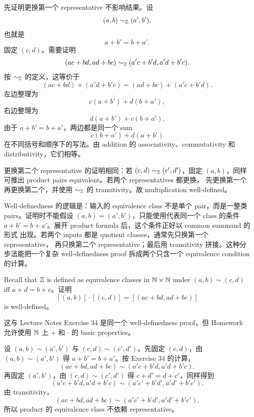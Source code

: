 \begin{solution}
先证明更换第一个 representative 不影响结果。设
\[
  (a,b)\sim_{\mathbb{Z}}(a',b'),
\]
也就是
\[
  a+b'=b+a'.
\]
固定 \((c,d)\)。需要证明
\[
  (ac+bd,ad+bc)\sim_{\mathbb{Z}}(a'c+b'd,a'd+b'c).
\]
按 \(\sim_{\mathbb{Z}}\) 的定义，这等价于
\[
  (ac+bd)+(a'd+b'c)=(ad+bc)+(a'c+b'd).
\]
左边整理为
\[
  c(a+b')+d(b+a'),
\]
右边整理为
\[
  d(a+b')+c(b+a').
\]
由于 \(a+b'=b+a'\)，两边都是同一个 sum
\[
  c(b+a')+d(a+b')
\]
在不同括号和顺序下的写法。由 addition 的 associativity、commutativity 和
distributivity，它们相等。

更换第二个 representative 的证明相同：若 \((c,d)\sim_{\mathbb{Z}}(c',d')\)，固定
\((a,b)\)，同样可推出 product pairs equivalent。若两个 representatives 都更换，
先更换第一个再更换第二个，并使用 \(\sim_{\mathbb{Z}}\) 的 transitivity。故 multiplication
well-defined。
\end{solution}

\begin{explanation}
Well-definedness 的逻辑是：输入的 equivalence class 不是单个 pair，而是一整类
pairs。证明时不能假设 \((a,b)=(a',b')\)，只能使用代表同一个 class 的条件
\(a+b'=b+a'\)。展开 product formula 后，这个条件正好以 common summand 的形式
出现。若两个 inputs 都是 quotient classes，通常先只换第一个 representative，
再只换第二个 representative；最后用 transitivity 拼接。这种分步法能把一个复杂
well-definedness proof 拆成两个只含一个 equivalence condition 的计算。
\end{explanation}

\begin{exerciseblock}
Recall that \(\mathbb{Z}\) is defined as equivalence classes in \(\mathbb{N}\times\mathbb{N}\) under
\((a,b)\sim(c,d)\) iff \(a+d=b+c\)。证明
\[
  [(a,b)]\cdot[(c,d)]=[(ac+bd,ad+bc)]
\]
is well-defined。
\end{exerciseblock}

\begin{solution}
这与 Lecture Notes Exercise 34 是同一个 well-definedness proof，但 Homework
允许使用 \(\mathbb{N}\) 上 \(+\) 和 \(\cdot\) 的 basic properties。

设 \((a,b)\sim(a',b')\) 与 \((c,d)\sim(c',d')\)。先固定 \((c,d)\)，由
\((a,b)\sim(a',b')\) 得 \(a+b'=b+a'\)。按 Exercise 34 的计算，
\[
  (ac+bd,ad+bc)\sim(a'c+b'd,a'd+b'c).
\]
再固定 \((a',b')\)，由 \((c,d)\sim(c',d')\) 得 \(c+d'=d+c'\)，同样得到
\[
  (a'c+b'd,a'd+b'c)\sim(a'c'+b'd',a'd'+b'c').
\]
由 transitivity，
\[
  (ac+bd,ad+bc)\sim(a'c'+b'd',a'd'+b'c').
\]
所以 product 的 equivalence class 不依赖 representative。
\end{solution}

